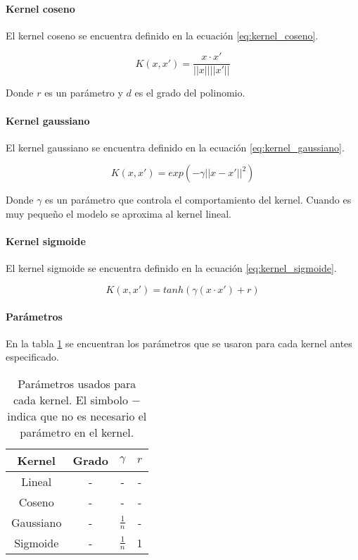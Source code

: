 \paragraph{Kernel coseno}

El kernel coseno se encuentra definido en la ecuación \ref{eq:kernel_coseno}.

\begin{equation}
    K(x,x') = \frac{x\cdot x'}{||x|| ||x'||}
    \label{eq:kernel_coseno}
\end{equation}

Donde $r$ es un parámetro y $d$ es el grado del polinomio.

\paragraph{Kernel gaussiano}

El kernel gaussiano se encuentra definido en la ecuación \ref{eq:kernel_gaussiano}.

\begin{equation}
    K(x,x') = exp(- \gamma ||x - x'||^2)
    \label{eq:kernel_gaussiano}
\end{equation}

Donde $\gamma$ es un parámetro que controla el comportamiento del kernel. Cuando es muy pequeño el modelo se aproxima al kernel lineal.

\paragraph{Kernel sigmoide}

El kernel sigmoide se encuentra definido en la ecuación \ref{eq:kernel_sigmoide}.

\begin{equation}
    K(x,x') = tanh(\gamma (x \cdot x') +r)
    \label{eq:kernel_sigmoide}
\end{equation}


\paragraph{Parámetros}

En la tabla \ref{table:pca_parameters} se encuentran los parámetros que se usaron para cada kernel antes especificado.

\begin{table}[H]
    \centering
    \begin{tabular}{cccc} \hline
        Kernel    & Grado & $\gamma$      & $r$ \\ \hline
        Lineal    & -     & -             & -   \\
        Coseno    & -     & -             & -   \\
        Gaussiano & -     & $\frac{1}{n}$ & -   \\
        Sigmoide  & -     & $\frac{1}{n}$ & 1   \\ \hline
    \end{tabular}
    \caption{Parámetros usados para cada kernel. El simbolo $-$ indica que no es necesario el parámetro en el kernel.}
    \label{table:pca_parameters}
\end{table}
